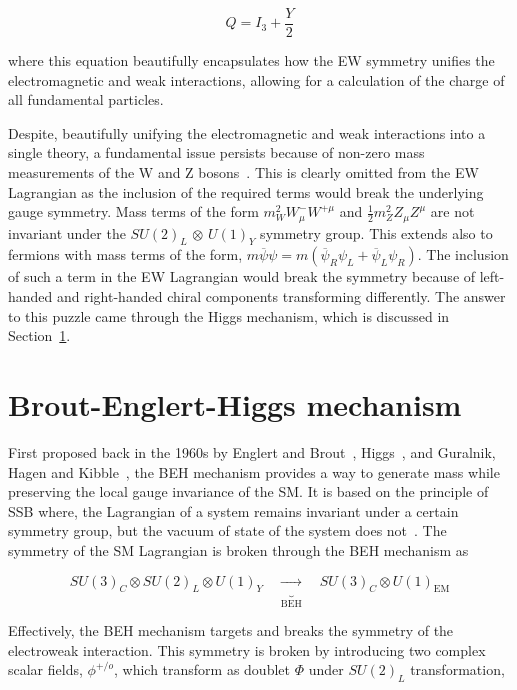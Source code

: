 \begin{equation}
    Q = I_3 + \frac{Y}{2}
\end{equation}

where this equation beautifully encapsulates how the EW symmetry unifies the electromagnetic and weak interactions, allowing for a calculation of the charge of all fundamental particles.

Despite, beautifully unifying the electromagnetic and weak interactions into a single theory, a fundamental issue persists because of non-zero mass measurements of the W and Z bosons~\cite{W_Z_MassMeasurements_1,W_Z_MassMeasurements_2}. This is clearly omitted from the EW Lagrangian as the inclusion of the required terms would break the underlying gauge symmetry. Mass terms of the form ${m_{W}^2 W_{\mu}^{-} W^{+\mu}}$ and $\frac{1}{2} m_{Z}^{2} Z_{\mu} Z^{\mu}$ are not invariant under the $SU(2)_{L}$ $\otimes$ $U(1)_{Y}$ symmetry group. This extends also to fermions with mass terms of the form, $m\overline{\psi}\psi = m(\overline{\psi}_{R}\psi_{L} + \overline{\psi}_{L}\psi_{R})$. The inclusion of such a term in the EW Lagrangian would break the symmetry because of left-handed and right-handed chiral components transforming differently. The answer to this puzzle came through the Higgs mechanism, which is discussed in Section~\ref{Section:Introduction_HiggsMechanism}.

\section{Brout-Englert-Higgs mechanism}
\label{Section:Introduction_HiggsMechanism}
First proposed back in the 1960s by Englert and Brout~\cite{Englert_Brout}, Higgs~\cite{Higgs_2}, and Guralnik, Hagen and Kibble~\cite{Guralnik_Hagen_Kibble,Kibble_1}, the \ac{BEH} mechanism provides a way to generate mass while preserving the local gauge invariance of the SM. It is based on the principle of \ac{SSB} where, the Lagrangian of a system remains invariant under a certain symmetry group, but the vacuum of state of the system does not~\cite{SSB_Definition}. The symmetry of the SM Lagrangian is broken through the BEH mechanism as

\begin{equation}
    SU(3)_C \otimes SU(2)_L \otimes U(1)_Y \quad \underbrace{\rightarrow}_{\text{BEH}} \quad SU(3)_C \otimes U(1)_{\text{EM}}
\end{equation}

Effectively, the BEH mechanism targets and breaks the symmetry of the electroweak interaction. This symmetry is broken by introducing two complex scalar fields, $\phi^{+/o}$, which transform as doublet $\Phi$ under $SU(2)_L$ transformation,

